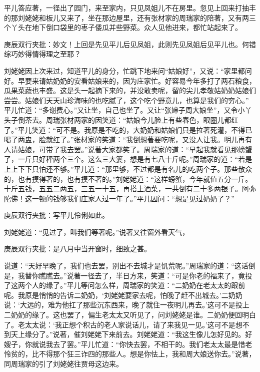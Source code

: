 \begin{parag}
    平儿答应著，一径出了园门，来至家内，只见凤姐儿不在房里。忽见上回来打抽丰的那刘姥姥和板儿又来了，坐在那边屋里，还有张材家的周瑞家的陪著，又有两三个丫头在地下倒口袋里的枣子倭瓜并些野菜。众人见他进来，都忙站起来了。\begin{note}庚辰双行夹批：妙文！上回是先见平儿后见凤姐，此则先见凤姐后见平儿也。何错综巧妙得情得理之至耶？\end{note}刘姥姥因上次来过，知道平儿的身分，忙跳下地来问“姑娘好”，又说：“家里都问好。早要来请姑奶奶的安看姑娘来的，因为庄家忙。好容易今年多打了两石粮食，瓜果菜蔬也丰盛。这是头一起摘下来的，并没敢卖呢，留的尖儿孝敬姑奶奶姑娘们尝尝。姑娘们天天山珍海味的也吃腻了，这个吃个野意儿，也算是我们的穷心。” 平儿忙道：“多谢费心。”又让坐，自己也坐了。又让“张婶子周大娘坐”，又令小丫头子倒茶去。周瑞张材两家的因笑道：“姑娘今儿脸上有些春色，眼圈儿都红了。”平儿笑道：“可不是。我原是不吃的，大奶奶和姑娘们只是拉著死灌，不得已喝了两盅，脸就红了。”张材家的笑道：“我倒想著要吃呢，又没人让我。明儿再有人请姑娘，可带了我去罢。”说著大家都笑了。周瑞家的道：“早起我就看见那螃蟹了，一斤只好秤两个三个。这么三大篓，想是有七八十斤呢。”周瑞家的道：“若是上上下下只怕还不够。”平儿道：“那里够，不过都是有名儿的吃两个子。那些散众的，也有摸得著的，也有摸不著的。”刘姥姥道：“这样螃蟹，今年就值五分一斤。十斤五钱，五五二两五，三五一十五，再搭上酒菜，一共倒有二十多两银子。阿弥陀佛！这一顿的钱够我们庄家人过一年了。”平儿因问：“想是见过奶奶了？”\begin{note}庚辰双行夹批：写平儿伶俐如此。\end{note}刘姥姥道：“见过了，叫我们等著呢。”说著又往窗外看天气，\begin{note}庚辰双行夹批：是八月中当开窗时，细致之甚。\end{note}说道：“天好早晚了，我们也去罢，别出不去城才是饥荒呢。”周瑞家的道：“这话倒是，我替你瞧瞧去。”说著一径去了，半日方来，笑道：“可是你老的福来了，竟投了这两个人的缘了。”平儿等问怎么样，周瑞家的笑道：“二奶奶在老太太的跟前呢。我原是悄悄的告诉二奶奶，‘刘姥姥要家去呢，怕晚了赶不出城去。’二奶奶说：‘大远的，难为他扛了那些沉东西来，晚了就住一夜明儿再去。’这可不是投上二奶奶的缘了。这也罢了，偏生老太太又听见了，问刘姥姥是谁。二奶奶便回明白了。老太太说：‘我正想个积古的老人家说话儿，请了来我见一见。’这可不是想不到天上缘分了。”说著，催刘姥姥下来前去。刘姥姥道：“我这生像儿怎好见的。好嫂子，你就说我去了罢。”平儿忙道：“你快去罢，不相干的。我们老太太最是惜老怜贫的，比不得那个狂三诈四的那些人。想是你怯上，我和周大娘送你去。”说著，同周瑞家的引了刘姥姥往贾母这边来。
\end{parag}


